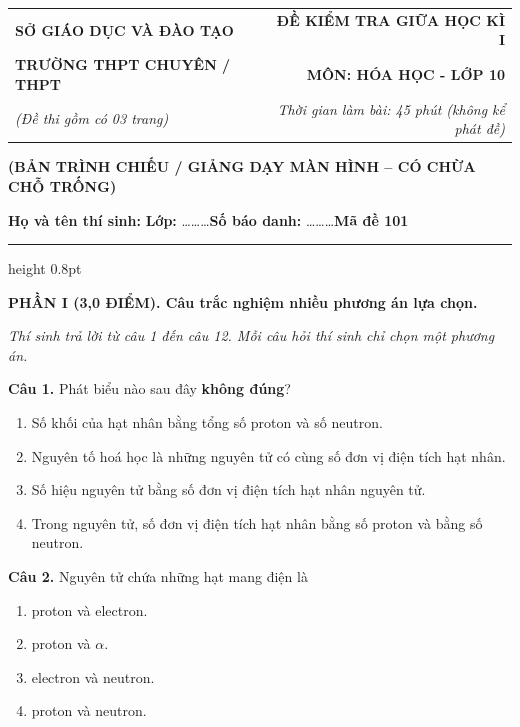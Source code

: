 \documentclass[13pt,a4paper]{article}
\begin{document}
\begin{tabularx}{\textwidth}{@{}l X r@{}}
\textbf{\small SỞ GIÁO DỤC VÀ ĐÀO TẠO} & & \textbf{\small ĐỀ KIỂM TRA GIỮA HỌC KÌ I} \\
\textbf{\normalsize TRƯỜNG THPT CHUYÊN / THPT} & & \textbf{\normalsize MÔN: HÓA HỌC - LỚP 10} \\
\textit{\small (Đề thi gồm có 03 trang)} & & \textit{\small Thời gian làm bài: 45 phút (không kể phát đề)}
\end{tabularx}

\begin{center}
{\color{purple!80!black}\textbf{(BẢN TRÌNH CHIẾU / GIẢNG DẠY MÀN HÌNH -- CÓ CHỪA CHỖ TRỐNG)}}\par\vspace{3pt}
\textbf{Họ và tên thí sinh:} \dotfill \quad \textbf{Lớp:} \dots\dots\dots \quad \textbf{Số báo danh:} \dots\dots\dots \hfill \textbf{\large Mã đề 101}
\end{center}
\vspace{-4pt}
{\color{gray!50}\hrule height 0.8pt}
\vspace{6pt}

{\color{myGreen}\bfseries\large PHẦN I (3,0 ĐIỂM). Câu trắc nghiệm nhiều phương án lựa chọn.}

\textit{\small Thí sinh trả lời từ câu 1 đến câu 12. Mỗi câu hỏi thí sinh chỉ chọn một phương án.}
\vspace{3pt}

\textbf{Câu 1.} Phát biểu nào sau đây \textbf{không đúng}?
\begin{enumerate}[label=\textbf{\Alph*.},leftmargin=*,itemsep=1pt,topsep=1pt]
\item Số khối của hạt nhân bằng tổng số proton và số neutron.
\item Nguyên tố hoá học là những nguyên tử có cùng số đơn vị điện tích hạt nhân.
\item Số hiệu nguyên tử bằng số đơn vị điện tích hạt nhân nguyên tử.
\item Trong nguyên tử, số đơn vị điện tích hạt nhân bằng số proton và bằng số neutron.
\end{enumerate}
\vspace{1.5cm}

\textbf{Câu 2.} Nguyên tử chứa những hạt mang điện là
\begin{enumerate}[label=\textbf{\Alph*.},leftmargin=*,itemsep=1pt,topsep=1pt]
\item proton và electron.
\item proton và $\alpha$.
\item electron và neutron.
\item proton và neutron.
\end{enumerate}
\vspace{1.5cm}
\end{document}

